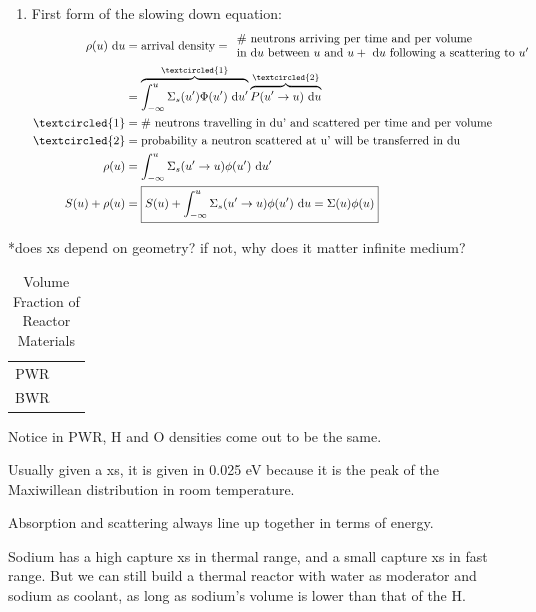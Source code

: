 \documentclass{school-22.211-notes}
\begin{document}
\begin{enumerate}
\item First form of the slowing down equation:
  \begin{align}
    \rho(u) \du 
    &= \mbox{arrival density} = \begin{array}{l}
      \mbox{\# neutrons arriving per time and per volume} \\
      \mbox{in d$u$ between $u$ and $u + \du$ following a scattering to $u'$} 
      \end{array} \\
    &= \overbrace{\int_{-\infty}^u \Sigma_s (u') \Phi(u') \du'}^{\textcircled{1}} \overbrace{ P(u'\to u) \du }^{\textcircled{2}} \\
    \textcircled{1} &= \mbox{\# neutrons travelling in du' and scattered per time and per volume} \\
    \textcircled{2} &= \mbox{probability a neutron scattered at u' will be transferred in du} \\
    \rho(u) &= \int_{-\infty}^u \Sigma_s (u'\to u) \phi(u') \du' \\
    S(u) + \rho(u) &= \boxed{S(u) + \int_{-\infty}^u \Sigma_s (u'\to u) \phi(u') \du  = \Sigma(u) \phi(u) }
  \end{align}
\end{enumerate}



*does xs depend on geometry? if not, why does it matter infinite medium? 


\begin{table}
  \centering
  \begin{tabular}{|c|c|c|}
    PWR & & \\
    BWR & & 
  \end{tabular}
  \caption{Volume Fraction of Reactor Materials}
\end{table}
Notice in PWR, H and O densities come out to be the same. 

Usually given a xs, it is given in 0.025 eV because it is the peak of the Maxiwillean distribution in room temperature. 

Absorption and scattering always line up together in terms of energy. 

Sodium has a high capture xs in thermal range, and a small capture xs in fast range. But we can still build a thermal reactor with water as moderator and sodium as coolant, as long as sodium's volume is lower than that of the H. 
\end{document}
